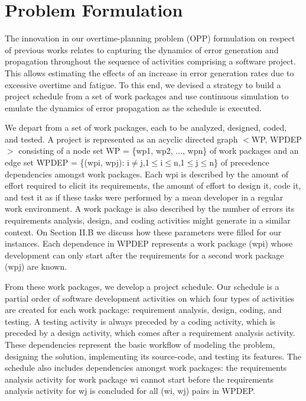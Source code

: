 \documentclass[conference]{IEEEtran}
\begin{document}
\section{Problem Formulation}
The innovation in our overtime-planning problem (OPP) formulation on respect of previous works relates to capturing the dynamics of error generation and propagation throughout the sequence of activities comprising a software project. This allows estimating the effects of an increase in error generation rates due to excessive overtime and fatigue. To this end, we devised a strategy to build a project schedule from a set of work packages and use continuous simulation to emulate the dynamics of error propagation as the schedule is executed.

We depart from a set of work packages, each to be analyzed, designed, coded, and tested. A project is represented as an acyclic directed graph $<$WP, WPDEP$>$ consisting of a node set WP = \{wp1, wp2, ..., wpn\} of work packages and an edge set WPDEP = \{(wpi, wpj): i$\not=$j,1$\leq$i$\leq$n,1$\leq$j$\leq$n\} of precedence dependencies amongst work packages. Each wpi is described by the amount of effort required to elicit its requirements, the amount of effort to design it, code it, and test it as if these tasks were performed by a mean developer in a regular work environment. A work package is also described by the number of errors its requirements analysis, design, and coding activities might generate in a similar context. On Section II.B we discuss how these parameters were filled for our instances. Each dependence in WPDEP represents a work package (wpi) whose development can only start after the requirements for a second work package (wpj) are known.

From these work packages, we develop a project schedule. Our schedule is a partial order of software development activities on which four types of activities are created for each work package: requirement analysis, design, coding, and testing. A testing activity is always preceded by a coding activity, which is preceded by a design activity, which comes after a requirement analysis activity. These dependencies represent the basic workflow of modeling the problem, designing the solution, implementing its source-code, and testing its features. The schedule also includes dependencies amongst work packages: the requirements analysis activity for work package wi cannot start before the requirements analysis activity for wj is concluded for all (wi, wj) pairs in WPDEP. 
\end{document}
